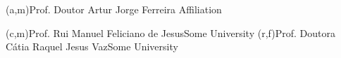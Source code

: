 \ncmember(a,m){Prof. Doutor Artur Jorge Ferreira}{ Affiliation} 

\ncmember(c,m){Prof. Rui Manuel Feliciano de Jesus}{Some University}
\ncmember(r,f){Prof. Doutora Cátia Raquel Jesus Vaz}{Some University}





